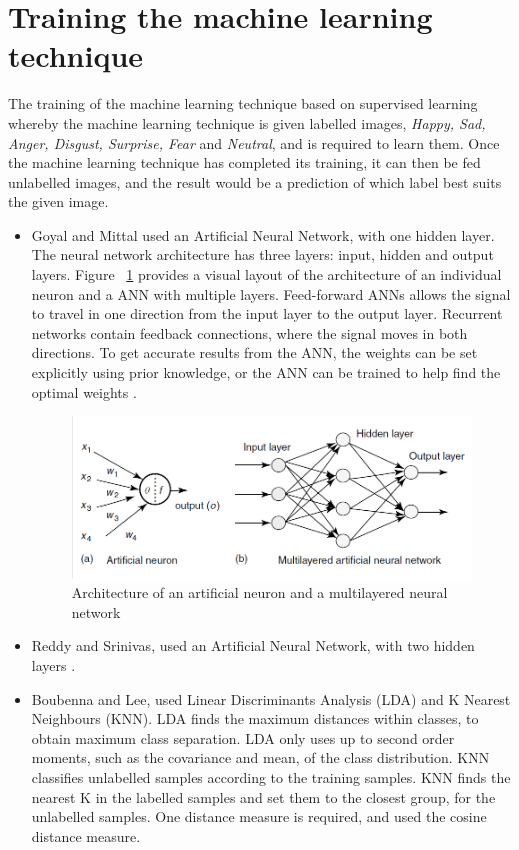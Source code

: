 
\section{Training the machine learning technique}
The training of the machine learning technique based on supervised learning whereby the machine learning technique is given labelled images, \textit{Happy, Sad, Anger, Disgust, Surprise, Fear} and
 \textit{Neutral},  and is required to learn them. Once the machine learning technique has completed its training, it can then be fed unlabelled images, and the result would be a prediction of which label best suits the given image. 
\begin{itemize}
\item Goyal and Mittal used an Artificial Neural Network, with one hidden layer. The neural network architecture has three layers: input, hidden and output layers. Figure ~\ref{fig:nn} provides a visual layout of the architecture of an individual neuron and a ANN with multiple layers. Feed-forward ANNs allows the signal to travel in one direction from the input layer to the output layer. Recurrent networks contain feedback connections, where the signal moves in both directions. To get accurate results from the ANN, the weights can be set explicitly using prior knowledge, or the ANN can be trained to help find the optimal weights \cite{1, ann}.
\begin{figure}[ht]
  \centering
  \includegraphics[scale=0.8]{8}
  \caption{Architecture of an artificial neuron and a multilayered neural network }
  \label{fig:nn}
\end{figure}
\item Reddy and Srinivas, used an Artificial Neural Network, with two hidden layers \cite{2}. 
\item Boubenna and Lee, used Linear Discriminants Analysis (LDA) and K Nearest Neighbours (KNN). LDA finds the maximum distances within classes, to obtain maximum class separation. LDA only uses up to second order moments, such as the covariance and mean, of the class distribution. KNN classifies unlabelled samples according to the training samples. KNN finds the nearest K in the labelled samples and set them to the closest group, for the unlabelled samples. One distance measure is required, and \cite{3} used the cosine distance measure.
\end{itemize}
